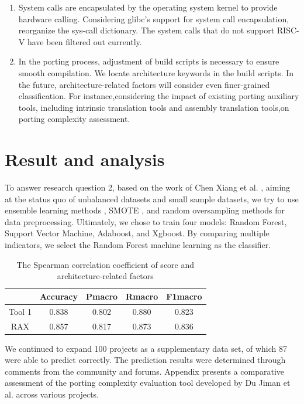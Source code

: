 \documentclass[sigconf,screen,review]{acmart}
\begin{document}
\begin{enumerate}
  \item System calls are encapsulated by the operating system kernel to provide hardware calling.
  Considering glibc's support for system call encapsulation, reorganize the sys-call dictionary.
  The system calls that do not support RISC-V have been filtered out currently.
  \item In the porting process, adjustment of build scripts is necessary to ensure smooth compilation.
  We locate architecture keywords in the build scripts.
  In the future, architecture-related factors will consider even finer-grained classification.
  For instance,considering the impact of existing porting auxiliary tools, including intrinsic translation tools and assembly translation tools,on porting complexity assessment.
\end{enumerate}

\section{Result and analysis}

To answer research question 2, based on the work of Chen Xiang et al. \cite{5128907}, aiming at the status quo of unbalanced datasets and small sample datasets, we try to use ensemble learning methods \cite{6509481}, SMOTE \cite{4271036}, and random oversampling methods for data preprocessing.
Ultimately, we chose to train four models: Random Forest, Support Vector Machine, Adaboost, and Xgboost.
By comparing multiple indicators, we select the Random Forest machine learning as the classifier.

\begin{table}
  \caption{The Spearman correlation coefficient of score and architecture-related factors}
  \label{tab:evaluation}
  \begin{tabular}{ccccc}
    \toprule
     & Accuracy & Pmacro & Rmacro & F1macro \\
    \midrule
    Tool 1 & 0.838 & 0.802 & 0.880 & 0.823 \\
    RAX & 0.857 & 0.817 & 0.873 & 0.836 \\
  \bottomrule
\end{tabular}
\end{table}

We continued to expand 100 projects as a supplementary data set, of which 87 were able to predict correctly.
The prediction results were determined through comments from the community and forums.
Appendix presents a comparative assessment of the porting complexity evaluation tool developed by Du Jiman et al. across various projects.
\end{document}
